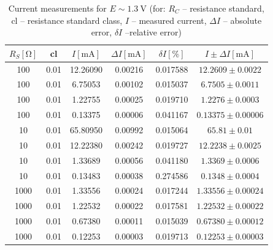\begin{table}[H]
	\centering
	\begin{tabular}{ c | c | c | c | c | c  }
		$R_S [\unit{\ohm}]$& cl & $I [\unit{\milli\ampere}]$ & $\Delta I [\unit{\milli\ampere}]$ & $\delta I [\unit{\percent}]$ & $I \pm \Delta I [\unit{\milli\ampere}]$\\
		\hline
		100	& 0.01 & 12.26090	& 0.00216	& 0.017588 & $12.2609\pm 0.0022$\\
		100	&0.01	&6.75053	&0.00102	&0.015037&$6.7505\pm 0.0011$\\
		100	&0.01	&1.22755&	0.00025	&0.019710&$1.2276 \pm 0.0003$\\
		100	&0.01&	0.13375	&0.00006&	0.041167&$0.13375\pm 0.00006$\\
		10	&0.01	&65.80950	&0.00992&	0.015064&$65.81\pm 0.01$\\
		10	&0.01	&12.22380	&0.00242	&0.019727&$12.2238\pm 0.0025$\\
		10	&0.01	&1.33689	&0.00056	&0.041180&$1.3369 \pm 0.0006$\\
		10	&0.01	&0.13483	&0.00038	&0.274586&$0.1348\pm 0.0004$\\
		1000&	0.01&	1.33556	&0.00024&	0.017244&$1.33556\pm 0.00024$\\
		1000&	0.01&	1.22532	&0.00022	&0.017581&$1.22532\pm 0.00022$\\
		1000&	0.01&	0.67380	&0.00011	&0.015039& $0.67380\pm 0.00012$\\
		1000&	0.01&	0.12253	&0.00003	&0.019713&$0.12253\pm 0.00003$\\
	\end{tabular}
	\caption{Current measurements for $E\sim\SI{1.3}{\volt}$ (for: $R_C$ -- resistance standard, cl -- resistance standard class, $I$ -- measured current, $\Delta I$ --  absolute error, $\delta I$ --relative error)}
	\label{tab:indirect_digital_2}
\end{table}

